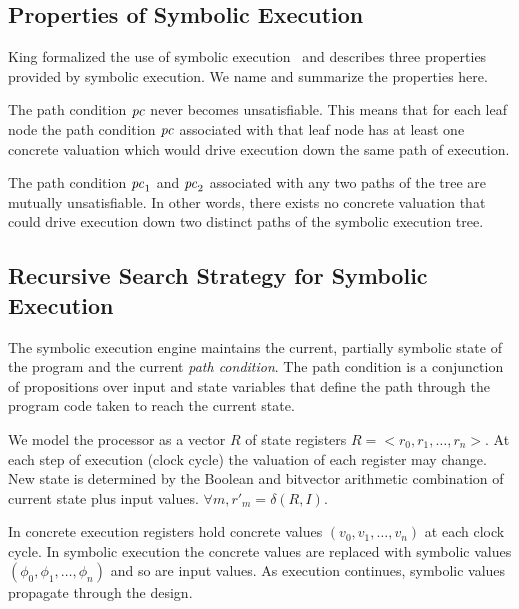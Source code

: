 \subsection{Properties of Symbolic Execution}
King formalized the use of symbolic execution~\cite{king1976symbolic} and describes three
properties provided by symbolic execution. We name and summarize the properties
here.
\begin{property}
  \label{prop:kingsound}
  The path condition $\mathit{pc}$ never becomes unsatisfiable. This means that for each
  leaf node the path condition $\mathit{pc}$ associated with that leaf node has at
  least one concrete valuation which would drive execution down the same path of
  execution.
\end{property}
\begin{property}
  \label{prop:kingunique}
The path condition $\mathit{pc}_1$ and $\mathit{pc}_2$ associated with any two paths of the
tree are mutually unsatisfiable. In other words, there exists no concrete
valuation that could drive execution down two distinct paths of the symbolic
execution tree.
\end{property}
\begin{property}[Commutativity]

\end{property}

\subsection{Recursive Search Strategy for Symbolic Execution}


The symbolic execution engine
maintains the current, partially symbolic state of the program and the current
\emph{path condition}. The path condition is a conjunction of propositions over
input and state variables that define the path through the program code taken to
reach the current state.


We model the processor as a vector $R$ of state registers $R = <r_0, r_1,
\ldots, r_n>$. At each step of execution (clock cycle) the valuation of each
register may change. New state is determined by the Boolean and bitvector
arithmetic combination of current state plus input values. $\forall m, r'_m =
\delta(R,I)$.

In concrete execution registers hold concrete values $(v_0, v_1, \ldots, v_n)$
at each clock cycle. In symbolic execution the concrete values are replaced with
symbolic values $(\phi_0, \phi_1, \ldots, \phi_n)$ and so are input values.
As execution continues, symbolic values propagate through the design.

